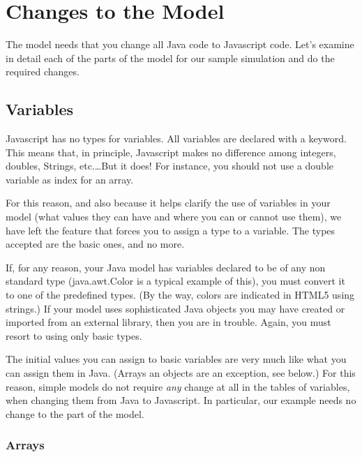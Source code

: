     \section{Changes to the Model}\label{section:04Model}

The model needs that you change all Java code to Javascript code. Let's examine in detail each of the parts of the model for our sample simulation and do the required changes.

\subsection{Variables}

Javascript has no types for variables. All variables are declared with a  keyword. This means that, in principle, Javascript makes no difference among integers, doubles, Strings, etc.\ldots But it does! For instance, you should not use a double variable as index for an array.

For this reason, and also because it helps clarify the use of variables in your model (what values they can have and where you can or cannot use them), we have left the feature that forces you to assign a type to a variable. The types accepted are the basic ones, and no more.

If, for any reason, your Java model has variables declared to be of any non standard type (java.awt.Color is a typical example of this), you must convert it to one of the predefined types. (By the way, colors are indicated in HTML5 using strings.) If your model uses sophisticated Java objects you may have created or imported from an external library, then you are in trouble. Again, you must resort to using only basic types. 

The initial values you can assign to basic variables are very much like what you can assign them in Java. (Arrays an objects are an exception, see below.) For this reason, simple models do not require \emph{any} change at all in the tables of variables, when changing them from Java to Javascript. 
In particular, our example needs no change to the  part of the model.

\subsubsection*{Arrays}

